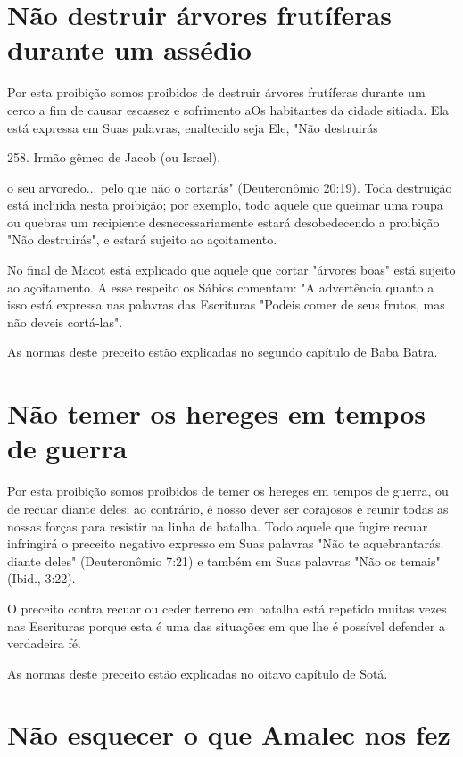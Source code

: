 \begin{itemize}
\begin{enumrate}
\begin{itemize}
\begin{itemize}
\begin{itemize}
\section{Não destruir árvores frutíferas durante um assédio}


Por esta proibição somos proibidos de destruir árvores frutíferas
du­rante um cerco a fim de causar escassez e sofrimento aOs habitantes
da cidade sitiada. Ela está expressa em Suas palavras, enaltecido seja
Ele, "Não destruirás

258. Irmão gêmeo de Jacob (ou Israel).

o seu arvoredo... pelo que não o cortarás" (Deuteronômio 20:19). Toda
des­truição está incluída nesta proibição; por exemplo, todo aquele que
queimar uma roupa ou quebras um recipiente desnecessariamente estará
desobedecen­do a proibição "Não destruirás", e estará sujeito ao
açoitamento.

No final de Macot está explicado que aquele que cortar "árvores boas"
está sujeito ao açoitamento. A esse respeito os Sábios comentam: "A
ad­vertência quanto a isso está expressa nas palavras das Escrituras
"Podeis comer de seus frutos, mas não deveis cortá-las".

As normas deste preceito estão explicadas no segundo capítulo de Baba
Batra.

\section{Não temer os hereges em tempos de guerra}

Por esta proibição somos proibidos de temer os hereges em tempos de
guerra, ou de recuar diante deles; ao contrário, é nosso dever ser
corajosos e reunir todas as nossas forças para resistir na linha de
batalha. Todo aquele que fugire recuar infringirá o preceito negativo
expresso em Suas palavras "Não te aquebrantarás. diante deles"
(Deuteronômio 7:21) e também em Suas pala­vras "Não os temais" (Ibid.,
3:22).

O preceito contra recuar ou ceder terreno em batalha está repetido
muitas vezes nas Escrituras porque esta é uma das situações em que lhe é
possí­vel defender a verdadeira fé.


As normas deste preceito estão explicadas no oitavo capítulo de Sotá.


\section{Não esquecer o que Amalec nos fez}


\end{itemize}
\end{itemize}
\end{itemize}
\end{enumrate}
\end{itemize}
